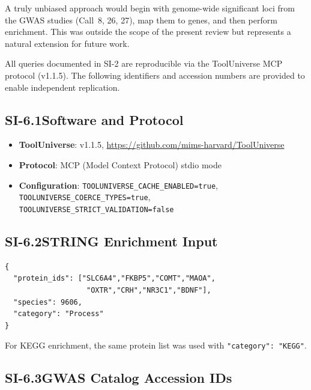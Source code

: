 A truly unbiased approach would begin with genome-wide significant loci from
the GWAS studies (Call~8, 26, 27), map them to genes, and then perform
enrichment.  This was outside the scope of the present review but represents
a natural extension for future work.


All queries documented in SI-2 are reproducible via the ToolUniverse MCP
protocol (v1.1.5).  The following identifiers and accession numbers are
provided to enable independent replication.

\subsection*{SI-6.1\quad Software and Protocol}

\begin{itemize}[nosep]
  \item \textbf{ToolUniverse}: v1.1.5,
        \url{https://github.com/mims-harvard/ToolUniverse}
  \item \textbf{Protocol}: MCP (Model Context Protocol) stdio mode
  \item \textbf{Configuration}: \texttt{TOOLUNIVERSE\_CACHE\_ENABLED=true},
        \texttt{TOOLUNIVERSE\_COERCE\_TYPES=true},
        \texttt{TOOLUNIVERSE\_STRICT\_VALIDATION=false}
\end{itemize}

\subsection*{SI-6.2\quad STRING Enrichment Input}

\begin{verbatim}
{
  "protein_ids": ["SLC6A4","FKBP5","COMT","MAOA",
                   "OXTR","CRH","NR3C1","BDNF"],
  "species": 9606,
  "category": "Process"
}
\end{verbatim}

\noindent
For KEGG enrichment, the same protein list was used with
\texttt{"category": "KEGG"}.

\subsection*{SI-6.3\quad GWAS Catalog Accession IDs}

